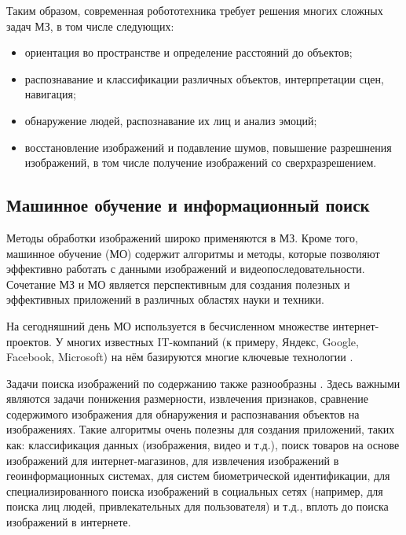Таким образом, современная робототехника требует решения многих сложных задач МЗ, в том числе следующих:

\begin{itemize}
	\item ориентация во пространстве и определение расстояний до объектов;
	\item распознавание и классификации различных объектов, интерпретации сцен, навигация;
	\item обнаружение людей, распознавание их лиц и анализ эмоций;
	\item восстановление изображений и подавление шумов, повышение разрешнения изображений, в том числе получение изображений со сверхразрешением.
\end{itemize}

\subsection{Машинное обучение и информационный поиск}
Методы обработки изображений широко применяются в МЗ. Кроме того, машинное обучение (МО) содержит алгоритмы и методы, которые позволяют эффективно работать с данными изображений и видеопоследовательности. Сочетание МЗ и МО является перспективным для создания полезных и эффективных приложений в различных областях науки и техники.

На сегодняшний день МО используется в бесчисленном множестве интернет-проектов. У многих известных IT-компаний (к примеру, Яндекс, Google, Facebook, Microsoft) на нём базируются многие ключевые технологии \cite{Cormier2016}.

Задачи поиска изображений по содержанию также разнообразны \cite{Meer2000}. Здесь важными являются задачи понижения размерности, извлечения признаков, сравнение содержимого изображения для обнаружения и распознавания объектов на изображениях. Такие алгоритмы очень полезны для создания приложений, таких как: классификация данных (изображения, видео и т.д.), поиск товаров на основе изображений для интернет-магазинов, для извлечения изображений в геоинформационных системах, для систем биометрической идентификации, для специализированного поиска изображений в социальных сетях (например, для поиска лиц людей, привлекательных для пользователя) \cite{Findface} и т.д., вплоть до поиска изображений в интернете.


